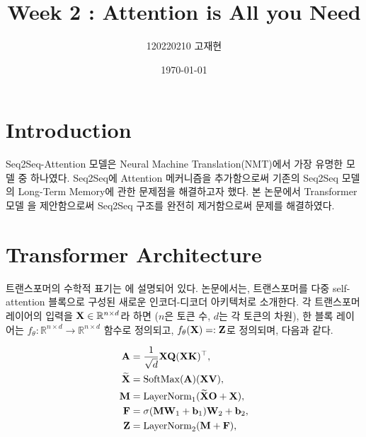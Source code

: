\documentclass[
	11pt,
	a4paper,
	figtabcapt,
]{oblivoir}
\title{\vspace{-4cm}Week 2 : Attention is All you Need}
\author{120220210 고재현}
\date{\today}
\begin{document}


\maketitle





\setcounter{table}{0}		                    %
\setcounter{figure}{0}		                    %



\section{Introduction}
Seq2Seq-Attention 모델은 Neural Machine Translation(NMT)에서 가장 유명한 모델 중 하나였다.
Seq2Seq에 Attention 메커니즘을 추가함으로써 기존의 Seq2Seq 모델의 Long-Term Memory에 관한 문제점을 해결하고자 했다.
본 논문에서 Transformer 모델 \cite[Transformer]{NIPS2017_3f5ee243} 을 제안함으로써 Seq2Seq 구조를 완전히 제거함으로써
문제를 해결하였다.

\section{Transformer Architecture}\label{sec:transformer_architecture}
트랜스포머의 수학적 표기는 \cite{min2022transformer}에 설명되어 있다.
논문에서는, 트랜스포머를 다중 self-attention 블록으로 구성된 새로운 인코더-디코더 아키텍처로 소개한다.
각 트랜스포머 레이어의 입력을 $\mathbf{X} \in \mathbb{R}^{n\times d}$라 하면 ($n$은 토큰 수, $d$는 각 토큰의 차원),
한 블록 레이어는 $f_\theta: \mathbb{R}^{n \times d} \rightarrow \mathbb{R}^{n \times d}$ 함수로 정의되고,
$f_\theta(\mathbf{X})=:\mathbf{Z}$로 정의되며, 다음과 같다.

\begin{align}
	\mathbf{A}&=\frac{1}{\sqrt{d}} \mathbf{X Q}(\mathbf{X}\mathbf{K})^{\top}, \label{eq:attention1}\\
	\widetilde{\mathbf{X}}&=\operatorname{SoftMax}(\mathbf{A}) (\mathbf{X} \mathbf{V}), \label{eq:attention2}\\
	\mathbf{M}&=\operatorname{LayerNorm}_{1}(\widetilde{\mathbf{X}}\mathbf{O}+\mathbf{X}), \label{eq:attention3}\\
	\mathbf{F}&=\sigma(\mathbf{M W}_1+\mathbf{b}_1) \mathbf{W}_2+\mathbf{b}_2, \label{eq:ffn}\\
	\mathbf{Z}&=\operatorname{LayerNorm}_{2}(\mathbf{M}+\mathbf{F}), \label{eq:layernorm}
\end{align}
	
\end{document}
